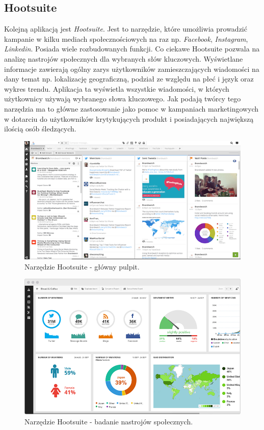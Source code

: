 \subsection{Hootsuite}

Kolejną aplikacją jest \textit{Hootsuite}. Jest to narzędzie, które umożliwia prowadzić kampanie w kilku mediach społecznościowych na raz np. \textit{Facebook}, \textit{Instagram}, \textit{Linkedin}. Posiada wiele rozbudowanych funkcji. Co ciekawe Hootsuite pozwala na analizę nastrojów społecznych dla wybranych słów kluczowych. Wyświetlane informacje zawierają ogólny zarys użytkowników zamieszczających wiadomości na dany temat np. lokalizację geograficzną, podział ze względu na płeć i język oraz wykres trendu. Aplikacja ta wyświetla wszystkie wiadomości, w których użytkownicy używają wybranego słowa kluczowego. Jak podają twórcy tego narzędzia ma to główne zastosowanie jako pomoc w kampaniach marketingowych w dotarciu do użytkowników krytykujących produkt i posiadających największą ilością osób śledzących.

\begin{figure}[h] %
	\centering
	\includegraphics[width=0.8\linewidth]{img/twitter_tool_hootsuite}
	\caption{Narzędzie Hootsuite - główny pulpit.}
\end{figure}

\begin{figure}[h] %
	\centering
	\includegraphics[width=0.8\linewidth]{img/twitter_tool_hootsuite_insights}
	\caption{Narzędzie Hootsuite - badanie nastrojów społecznych.}
\end{figure}

